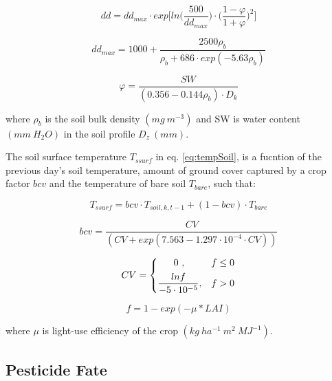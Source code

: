 \documentclass[]{article}
\begin{document}
\begin{equation}
dd = dd_{max} \cdot exp \Big[ln\Big(\frac{500}{dd_{max}} \Big) \cdot \Big(\frac{1-\varphi}{1+\varphi}\Big)^2\Big]
\label{eq:dd} 
\end{equation}

\begin{equation} 
dd_{max} = 1000 + \frac{2500\rho_b}{\rho_b+686 \cdot exp(-5.63\rho_b)}
\label{eq:ddmax} 
\end{equation}

\begin{equation} 
\varphi = \frac{SW}{(0.356-0.144\rho_b) \cdot D_{k}}
\label{eq:varphi} 
\end{equation}

where \(\rho_b\) is the soil bulk density \((mg~m^{-3})\) and SW is
water content \((mm~H_2O)\) in the soil profile \(D_z~(mm)\).

The soil surface temperature \(T_{ssurf}\) in eq. \ref{eq:tempSoil}, is
a fucntion of the previous day's soil temperature, amount of ground
cover captured by a crop factor \(bcv\) and the temperature of bare soil
\(T_{bare}\), such that:

\begin{equation} 
T_{ssurf} = bcv \cdot  T_{soil, k, t-1} + (1-bcv) \cdot T_{bare}
\label{eq:Tssurf} 
\end{equation}

\begin{equation} 
bcv = \frac{CV}{(CV+exp(7.563-1.297 \cdot 10^{-4} \cdot CV))}
\label{eq:Tssurf} 
\end{equation}

\begin{equation} 
    CV = 
\begin{dcases}
     ~~~~~0~,                                     & f \leq 0 \\
    \frac{lnf}{-5\cdot10^{-5}},              & f > 0 
\end{dcases}
\end{equation}

\begin{equation} 
f=1-exp(-\mu*LAI)
\label{eq:f} 
\end{equation}

where \(\mu\) is light-use efficiency of the crop
\((kg~ha^{-1}~m^2~MJ^{-1})\).

\subsection{Pesticide Fate}\label{pesticide-fate}
\end{document}
